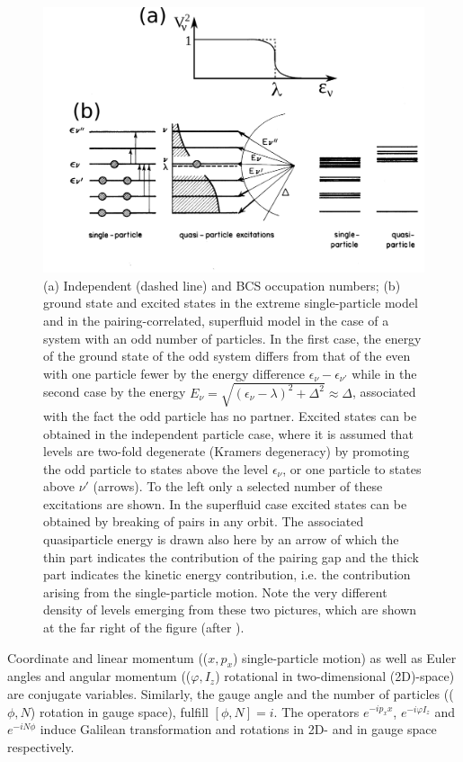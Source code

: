 \documentclass[a4paper,11pt]{book}
\numberwithin{equation}{section}
\numberwithin{figure}{section}
\numberwithin{table}{section}
\begin{document}
\begin{figure}
	\centerline {
		\includegraphics*[width=15cm, angle=0.]{introduccion/figs/fig0_4_4_v2}
	}
	\caption{(a) Independent (dashed line) and BCS occupation numbers; (b) ground state and excited states in the extreme single-particle model and in the pairing-correlated, superfluid model in the case of a system with an odd number of particles. In the first case, the energy of the ground state of the odd system differs from that of the even with one particle fewer by the energy difference $\epsilon_\nu-\epsilon_{\nu'}$ while in the second case by the energy $E_\nu=\sqrt{(\epsilon_\nu-\lambda)^2+\Delta^2}\approx\Delta$, associated with the fact the odd particle has no partner. Excited states can be obtained in the independent particle case, where it is assumed that levels are two-fold degenerate (Kramers degeneracy) by promoting the odd particle to states above the level $\epsilon_\nu$, or one particle to  states above  $\nu'$ (arrows). To the left only a selected number of these excitations are shown. In the superfluid case excited states can be obtained by breaking of pairs in any orbit. The associated quasiparticle energy is drawn also here by an arrow of which the thin part indicates the contribution of the pairing gap and the thick part indicates the kinetic energy contribution, i.e. the contribution arising from the single-particle motion. Note the very different density of levels emerging from these two pictures, which are shown at the far right of the figure (after \cite{Nathan:65}).}
	\label{fig0.4.3}
\end{figure}

Coordinate and linear momentum (($x,p_x$) single-particle motion) as well as Euler angles and angular momentum (($\varphi,I_z$) rotational in two-dimensional (2D)-space) are conjugate variables. Similarly, the gauge angle and the number of particles (($\phi,N$) rotation in gauge space), fulfill $[\phi,N]=i$. The operators $e^{-ip_xx}$, $e^{-i\varphi I_z}$ and $e^{-iN\phi}$ induce Galilean transformation and rotations in 2D- and in gauge space respectively.
\end{document}
